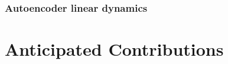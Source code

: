 \documentclass[12pt, letterpaper]{article}
\begin{document}
\subsubsection{Autoencoder linear dynamics}

\section{Anticipated Contributions}






\pagebreak



\end{document}
